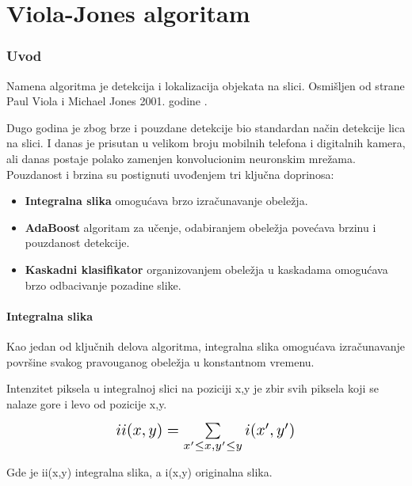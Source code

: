 \part{Viola-Jones algoritam}\label{viola_jones_algorithm}

\section{Uvod} \label{viola_jones_introduction}

Namena algoritma je detekcija i lokalizacija objekata na slici. Osmišljen od
strane Paul Viola i Michael Jones 2001. godine \cite{Viola2001RapidOD}.

Dugo godina je zbog brze i pouzdane detekcije bio standardan način detekcije
lica na slici. I danas je prisutan u velikom broju mobilnih telefona i
digitalnih kamera, ali danas postaje polako zamenjen konvolucionim neuronskim
mrežama. \\

Pouzdanost i brzina su postignuti uvođenjem tri ključna doprinosa:
\begin{itemize}

\item \textbf{Integralna slika} omogućava brzo izračunavanje obeležja.
\item \textbf{AdaBoost} algoritam za učenje, odabiranjem obeležja povećava
  brzinu i pouzdanost detekcije.
\item \textbf{Kaskadni klasifikator} organizovanjem obeležja u kaskadama
  omogućava brzo odbacivanje pozadine slike. \\
\end{itemize}


\subsection{Integralna slika}

Kao jedan od ključnih delova algoritma, integralna slika omogućava izračunavanje
površine svakog pravouganog obeležja u konstantnom vremenu.

Intenzitet piksela u integralnoj slici na poziciji x,y je zbir svih piksela koji
se nalaze gore i levo od pozicije x,y.

\begin{equation}
  \Scale[1.4]{ii(x,y)=\sum\limits_{x'\leq x, y'\leq y} i(x',y')}
  \label{IntegralImage_eq1}
\end{equation}

Gde je ii(x,y) integralna slika, a i(x,y) originalna slika. \\

